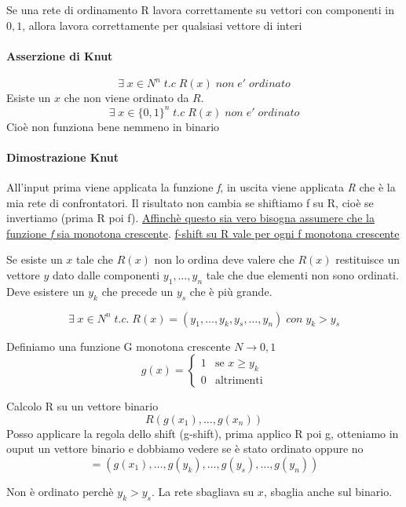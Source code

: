 \begin{definizione}
    Se una rete di ordinamento R lavora correttamente su vettori con componenti in ${0,1}$, allora lavora correttamente per qualsiasi vettore di interi
\end{definizione}

\paragraph{Asserzione di Knut}
$$\exists \; x \in N^n \;t.c\; R(x)\;non\;e'\;ordinato$$
Esiste un $x$ che non viene ordinato da $R$.
$$\exists \; x \in \{0,1\}^n \;t.c\; R(x)\;non\;e'\;ordinato$$
Cioè non funziona bene nemmeno in binario

\paragraph{Dimostrazione Knut}
All'input prima viene applicata la funzione \textit{f}, in uscita viene applicata \textit{R} che è la mia rete di confrontatori. Il risultato non cambia se shiftiamo f su R, cioè se invertiamo (prima R poi f). \uline{Affinchè questo sia vero bisogna assumere che la funzione \textit{f} sia monotona crescente}. \uline{f-shift su R vale per ogni f monotona crescente}

Se esiste un $x$ tale che $R(x)$ non lo ordina deve valere che $R(x)$ restituisce un vettore $y$ dato dalle componenti $y_1, \dots, y_n$ tale che due elementi non sono ordinati. Deve esistere un $y_k$ che precede un $y_s$ che è più grande.

$$\exists\; x \in N^n \;t.c.\; R(x) = (y_1, \dots, y_k, y_s, \dots, y_n )\; con\; y_k > y_s$$

Definiamo una funzione G monotona crescente $N \rightarrow {0,1}$
\begin{equation}
    g(x) = 
        \begin{cases}
            1 & \text{se $x \geq y_k$}\\
            0 & \text{altrimenti}
        \end{cases}
\end{equation}

Calcolo R su un vettore binario 
$$R(g(x_1), \dots , g(x_n))$$
Posso applicare la regola dello shift (g-shift), prima applico R poi g, otteniamo in ouput un vettore binario e dobbiamo vedere se è stato ordinato oppure no
$$= (g(x_1), \dots , g(y_k), \dots, g(y_s), \dots , g(y_n))$$

Non è ordinato perchè $y_k > y_s$. La rete sbagliava su $x$, sbaglia anche sul binario.

